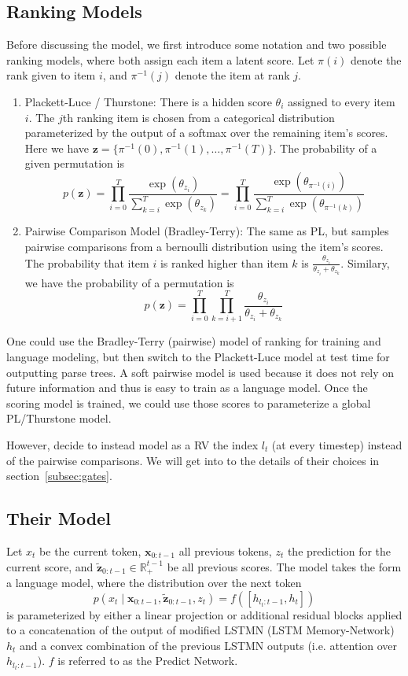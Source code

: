 \documentclass{article}
\newcommand{\bx}{\mathbf{x}}
\newcommand{\bz}{\mathbf{z}}
\newcommand{\R}{\mathbb{R}}
\begin{document}
\subsection{Ranking Models}
Before discussing the \citet{shen2018prpn} model, we first introduce
some notation and two possible ranking models, where both assign each item a latent score.
Let $\pi(i)$ denote the rank given to item $i$, and $\pi^{-1}(j)$ denote the 
item at rank $j$.
\begin{enumerate}
\item Plackett-Luce / Thurstone:
There is a hidden score $\theta_i$ assigned to every item $i$.
The $j$th ranking item is chosen from a categorical distribution 
parameterized by the output of a softmax over the remaining item's scores.
Here we have $\bz = \{\pi^{-1}(0),\pi^{-1}(1),\ldots,\pi^{-1}(T)\}$.
The probability of a given permutation is
$$
p(\bz)
= \prod_{i=0}^T\frac{\exp(\theta_{z_i})}{\sum_{k=i}^T \exp(\theta_{z_k})}
= \prod_{i=0}^T\frac{\exp(\theta_{\pi^{-1}(i)})}{\sum_{k=i}^T \exp(\theta_{\pi^{-1}(k)})}
$$
\item Pairwise Comparison Model (Bradley-Terry):
The same as PL, but samples pairwise comparisons from a bernoulli distribution
using the item's scores.
The probability that item $i$ is ranked higher than item $k$ is 
$\frac{\theta_{z_i}}{\theta_{z_i}+\theta_{z_k}}$.
Similary, we have the probability of a permutation is
$$
p(\bz) 
= \prod_{i=0}^T\prod_{k=i+1}^T\frac{\theta_{z_i}}{\theta_{z_i}+\theta_{z_k}}
$$
\end{enumerate}
One could use the Bradley-Terry (pairwise)
model of ranking for training and language modeling,
but then switch to the Plackett-Luce model at test time for outputting parse trees.
A soft pairwise model is used because it does not rely on future information and thus
is easy to train as a language model.
Once the scoring model is trained, we could use those scores to parameterize a global
PL/Thurstone model.

However, \citet{shen2018prpn} decide to instead
model as a RV the index $l_t$ (at every timestep) instead of the pairwise comparisons.
We will get into to the details of their choices in section~\ref{subsec:gates}.

\subsection{Their Model}
Let $x_t$ be the current token, $\bx_{0:t-1}$ all previous tokens,
$z_t$ the prediction for the current score,
and $\tilde{\bz}_{0:t-1}\in\R^{t-1}_+$ be all previous scores.
The model takes the form a language model,
where the distribution over the next token
$$p(x_t\mid \bx_{0:t-1}, \tilde{\bz}_{0:t-1},z_t) = f([h_{l_t:t-1},h_t])$$
is parameterized by either a linear projection or additional residual blocks
applied to a concatenation of the output of modified LSTMN (LSTM Memory-Network) $h_t$
and a convex combination of the previous LSTMN outputs (i.e. attention over $h_{l_t:t-1}$).
$f$ is referred to as the Predict Network.
\end{document}
